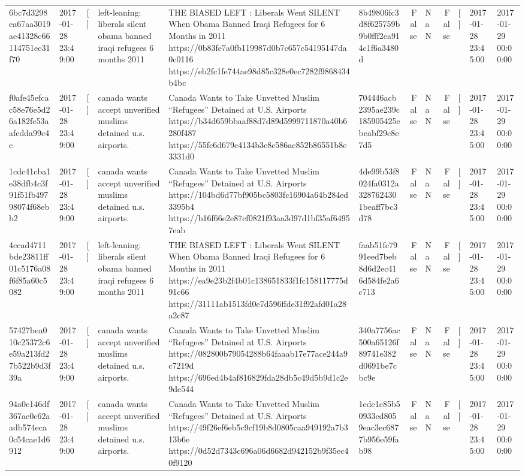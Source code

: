 \begin{tabular}{llllllrlrlll}
6bc7d3298ea67aa3019ae41328c66114751ec31f70 & 2017-01-28 23:49:00 & [] & left-leaning: liberals silent obama banned iraqi refugees 6 months 2011 & THE BIASED LEFT : Liberals Went SILENT When Obama Banned Iraqi Refugees for 6 Months in 2011 https://0b83fe7a0fb119987d0b7c657c54195147da0c0116 https://eb2fc1fe744ae98d85c328e0ec7282f9868434b4bc & 8b49806fc3d8f625759b9b0fff2ea914c1f6a3480d & False & NaN & False & [] & 2017-01-28 23:45:00 & 2017-01-29 00:00:00 \\
f0afe45efcac58e76e5d26a182fc53aafedda99c4c & 2017-01-28 23:49:00 & [] & canada wants accept unverified muslims detained u.s. airports. & Canada Wants to Take Unvetted Muslim “Refugees” Detained at U.S. Airports https://b34d659bbaaf88d7d89d5999711870a40b6280f487 https://55fc6d679c4134b3e8c586ac852b86551b8e3331d0 & 704446acb2395ae239c185905425ebcabf29c8e7d5 & False & NaN & False & [] & 2017-01-28 23:45:00 & 2017-01-29 00:00:00 \\
1cdc41cba1e38dfb4c3f91f51fb49798074f68ebb2 & 2017-01-28 23:49:00 & [] & canada wants accept unverified muslims detained u.s. airports. & Canada Wants to Take Unvetted Muslim “Refugees” Detained at U.S. Airports https://104bd6d77bf905bc5803fc16904a64b284ed3395b4 https://b16f66e2e87cf0821f93aa3d97d1bf35af64957eab & 4de99b53f8024fa0312a3287624301beaff7bc3d78 & False & NaN & False & [] & 2017-01-28 23:45:00 & 2017-01-29 00:00:00 \\
4ccad4711bde23811ff01c5176a08f6f85a60c5082 & 2017-01-28 23:49:00 & [] & left-leaning: liberals silent obama banned iraqi refugees 6 months 2011 & THE BIASED LEFT : Liberals Went SILENT When Obama Banned Iraqi Refugees for 6 Months in 2011 https://ea9e23b2f4b01c138651833f1fc158117775d91c66 https://31111ab1513fd0e7d596ffde31f92afd01a28a2c87 & faab51fc7991eed7beb8d6d2ec416d584fe2a6c713 & False & NaN & False & [] & 2017-01-28 23:45:00 & 2017-01-29 00:00:00 \\
57427bea010c25372c6e59a213fd27b522b9d3f39a & 2017-01-28 23:49:00 & [] & canada wants accept unverified muslims detained u.s. airports. & Canada Wants to Take Unvetted Muslim “Refugees” Detained at U.S. Airports https://082800b79054288b64faaab17e77ace244a9c7219d https://696ed4b4af816829fda28db5c49d5b9d1c2e9de544 & 340a7756ac500a65126f89741e382d0691be7cbc9e & False & NaN & False & [] & 2017-01-28 23:45:00 & 2017-01-29 00:00:00 \\
94a0c146df367ae0c62aadb574eca0c54cae1d6912 & 2017-01-28 23:49:00 & [] & canada wants accept unverified muslims detained u.s. airports. & Canada Wants to Take Unvetted Muslim “Refugees” Detained at U.S. Airports https://49f26ef6eb5c9cf19b8d0805caa949192a7b313b6e https://0d52d7343c696a06d6682d942152b9f35ec40f9120 & 1ede1c85b50933ed8059eac3ec6877b956e59fab98 & False & NaN & False & [] & 2017-01-28 23:45:00 & 2017-01-29 00:00:00 \\

\end{tabular}
